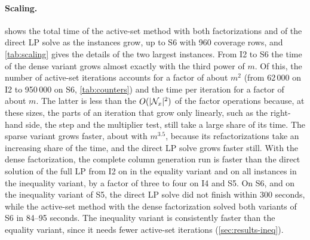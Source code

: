 \begin{table}[ht]
\centering
\scriptsize
\renewcommand{\arraystretch}{1.15}
\setlength{\tabcolsep}{3.5pt}
\caption{Events inside the active-set method (dense factorization) over a whole column
generation run: active-set iterations, primal steps (of which full steps), expansions,
representative swaps, reductions, expansions/reductions of surpluses, singular steps,
factorization updates, refactorizations (sparse / dense factorization), and the final sizes of
$\Nx$ and $\Ns$.}
\label{tab:counters}
\end{table}

\paragraph{Scaling.}  shows the total time of the active-set method with
both factorizations and of the direct LP solve as the instances grow, up to S6 with 960
coverage rows, and \cref{tab:scaling} gives the details of the two largest instances. From I2
to S6 the time of the dense variant grows almost exactly with the third power of $m$. Of this,
the number of active-set iterations accounts for a factor of about $m^2$ (from 62\,000 on I2 to
950\,000 on S6, \cref{tab:counters}) and the time per iteration for a factor of about $m$. The
latter is less than the $O(|\mathcal{N}_x|^2)$ of the factor operations because, at these sizes, the
parts of an iteration that grow only linearly, such as the right-hand side, the step and the
multiplier test, still take a large share of its time. The sparse variant grows faster, about
with $m^{3.5}$, because its refactorizations take an increasing share of the time, and the
direct LP solve grows faster still. With the dense
factorization, the complete column generation run is faster than the direct solution of the
full LP from I2 on in the equality variant and on all instances in the inequality variant, by
a factor of three to four on I4 and S5. On S6, and on the inequality variant of S5, the direct
LP solve did not finish within 300 seconds, while the active-set method with the dense
factorization solved both variants of S6 in 84--95 seconds. The inequality variant is
consistently faster than the equality variant, since it needs fewer active-set iterations
(\cref{sec:results-ineq}).

